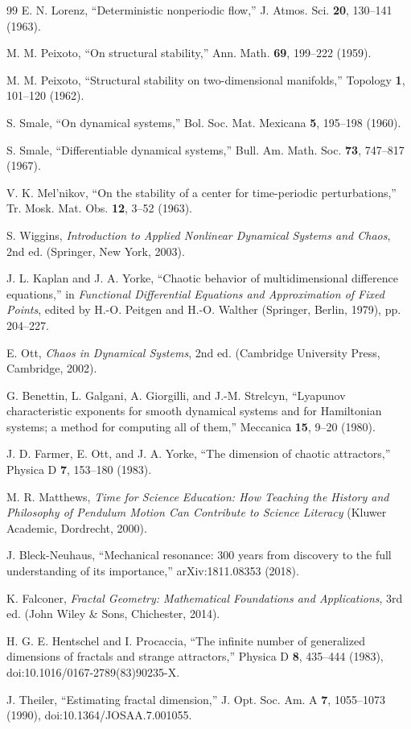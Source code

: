 \documentclass[aps,prb,reprint,floatfix]{revtex4-2}
\begin{document}
\begin{thebibliography}{99}
E. N. Lorenz, ``Deterministic nonperiodic flow,'' J. Atmos. Sci. \textbf{20}, 130--141 (1963).

M. M. Peixoto, ``On structural stability,'' Ann. Math. \textbf{69}, 199--222 (1959).

M. M. Peixoto, ``Structural stability on two-dimensional manifolds,'' Topology \textbf{1}, 101--120 (1962).

S. Smale, ``On dynamical systems,'' Bol. Soc. Mat. Mexicana \textbf{5}, 195--198 (1960).

S. Smale, ``Differentiable dynamical systems,'' Bull. Am. Math. Soc. \textbf{73}, 747--817 (1967).

V. K. Mel'nikov, ``On the stability of a center for time-periodic perturbations,'' Tr. Mosk. Mat. Obs. \textbf{12}, 3--52 (1963).

S. Wiggins, \textit{Introduction to Applied Nonlinear Dynamical Systems and Chaos}, 2nd ed. (Springer, New York, 2003).

J. L. Kaplan and J. A. Yorke, ``Chaotic behavior of multidimensional difference equations,'' in \textit{Functional Differential Equations and Approximation of Fixed Points}, edited by H.-O. Peitgen and H.-O. Walther (Springer, Berlin, 1979), pp. 204--227.

E. Ott, \textit{Chaos in Dynamical Systems}, 2nd ed. (Cambridge University Press, Cambridge, 2002).

G. Benettin, L. Galgani, A. Giorgilli, and J.-M. Strelcyn, ``Lyapunov characteristic exponents for smooth dynamical systems and for Hamiltonian systems; a method for computing all of them,'' Meccanica \textbf{15}, 9--20 (1980).

J. D. Farmer, E. Ott, and J. A. Yorke, ``The dimension of chaotic attractors,'' Physica D \textbf{7}, 153--180 (1983).

M. R. Matthews, \textit{Time for Science Education: How Teaching the History and Philosophy of Pendulum Motion Can Contribute to Science Literacy} (Kluwer Academic, Dordrecht, 2000).

J. Bleck-Neuhaus, ``Mechanical resonance: 300 years from discovery to the full understanding of its importance,'' arXiv:1811.08353 (2018).

K. Falconer, \textit{Fractal Geometry: Mathematical Foundations and Applications}, 3rd ed. (John Wiley \& Sons, Chichester, 2014).

H. G. E. Hentschel and I. Procaccia, ``The infinite number of generalized dimensions of fractals and strange attractors,'' Physica D \textbf{8}, 435--444 (1983), doi:10.1016/0167-2789(83)90235-X.

J. Theiler, ``Estimating fractal dimension,'' J. Opt. Soc. Am. A \textbf{7}, 1055--1073 (1990), doi:10.1364/JOSAA.7.001055.
\end{thebibliography}
\end{document}
